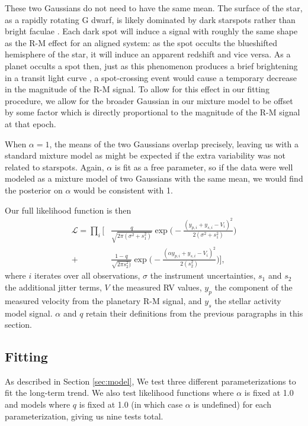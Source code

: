 \documentclass[twocolumn]{aastex63}
\begin{document}
These two Gaussians do not need to have the same mean. 
The surface of the star, as a rapidly rotating G dwarf, is likely dominated by dark starspots rather than bright faculae \citep{Montet17}. 
Each dark spot will induce a signal with roughly the same shape as the R-M effect for an aligned system: as the spot occults the blueshifted hemisphere of the star, it will induce an apparent redshift and vice versa.
As a planet occults a spot then, just as this phenomenon produces a brief brightening in a transit light curve \citep{Desert11, SanchisOjeda13, Morris17}, a spot-crossing event would cause a temporary decrease in the magnitude of the R-M signal. 
To allow for this effect in our fitting procedure, we allow for the broader Gaussian in our mixture model to be offset by some factor which is directly proportional to the magnitude of the R-M signal at that epoch. 

When $\alpha = 1$, the means of the two Gaussians overlap precisely, leaving us with a standard mixture model as might be expected if the extra variability was not related to starspots. Again, $\alpha$ is fit as a free parameter, so if the data were well modeled as a mixture model of two Gaussians with the same mean, we would find the posterior on $\alpha$ would be consistent with 1.


Our full likelihood function is then
\begin{equation}
\begin{split}
\mathcal{L} = \prod_i \bigg[ & \frac{q}{\sqrt{2\pi (\sigma^2 + s_1^2)}} \exp\bigg(-\frac{(y_{p,i} + y_{s,i}-V_i)^2}{2(\sigma^2 + s_1^2)}\bigg)  \\+ & \frac{1-q}{\sqrt{2\pi s_2^2)}} \exp\bigg(-\frac{(\alpha y_{p,i} + y_{s,i}-V_i)^2}{2(s_2^2)}\bigg) \bigg],
\end{split}
\end{equation}
where $i$ iterates over all observations, $\sigma$ the instrument uncertainties, $s_1$ and $s_2$ the additional jitter terms, $V$ the measured RV values, $y_p$ the component of the measured velocity from the planetary R-M signal, and $y_s$ the stellar activity model signal. $\alpha$ and $q$ retain their definitions from the previous paragraphs in this section.

\subsection{Fitting}

As described in Section \ref{sec:model}, We test three different parameterizations to fit the long-term trend. 
We also test likelihood functions where $\alpha$ is fixed at 1.0 and models where $q$ is fixed at 1.0 (in which case $\alpha$ is undefined) for each parameterization, giving us nine tests total.
\end{document}
